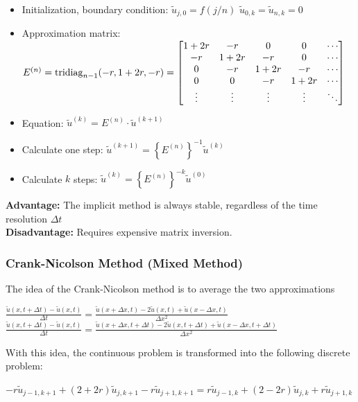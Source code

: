 \begin{itemize}
\item Initialization, boundary condition: $\tilde{u}_{j,0}=f(j/n)$ \qquad $\tilde{u}_{0,k}=\tilde{u}_{n,k}=0$
\item Approximation matrix: $E^{(n)}=\operatorname{tridiag}_{n-1}(-r,1+2r,-r)=\begin{bmatrix}
1+2r& -r		& 0		& 0 	&\cdots\\
-r	& 1+2r  & -r	& 0		&\cdots\\
0	& -r	& 1+2r 	& -r 	&\cdots\\
0	& 0		& -r	& 1+2r 	&\cdots\\
\vdots&	\vdots&\vdots&\vdots&\ddots
\end{bmatrix}$
\item Equation: $\tilde{u}^{(k)}=E^{(n)} \cdot \tilde{u}^{(k + 1)}$
\item Calculate one step: $\tilde{u}^{(k+1)}=\left\{E^{(n)}\right\}^{-1} \tilde{u}^{(k)}$
\item Calculate $k$ steps: $\tilde{u}^{(k)}=\left\{E^{(n)}\right\}^{\bm{-}k} \tilde{u}^{(0)}$
\end{itemize}

\textbf{Advantage:} The implicit method is always stable, regardless of the time resolution $\Delta t$\\
\textbf{Disadvantage:} Requires expensive matrix inversion.


\subsubsection{Crank-Nicolson Method (Mixed Method)}

The idea of the Crank-Nicolson method is to average the two approximations

$\boxed{\frac{\tilde{u}(x,t+\Delta t) - \tilde{u}(x,t)}{\Delta t} =
\frac{\tilde{u}(x+\Delta x, t)-2\tilde{u}(x,t) + \tilde{u}( x - \Delta x, t )} {\Delta x^2}}$\\
$\boxed{\frac{\tilde{u}(x,t+\Delta t) - \tilde{u}(x,t)}{\Delta t} =
\frac{\tilde{u}(x+\Delta x, t+\Delta t)-2\tilde{u}(x,t+\Delta t) + \tilde{u}( x - \Delta x, t +\Delta t)} {\Delta x^2}}$

With this idea, the continuous problem is transformed into the following discrete problem:

$-r \tilde{u}_{j-1,k+1} + (2+2r)\tilde{u}_{j,k+1} - r \tilde{u}_{j+1,k+1} = r
\tilde{u}_{j-1,k} + (2-2r)\tilde{u}_{j,k} + r \tilde{u}_{j+1,k} $

